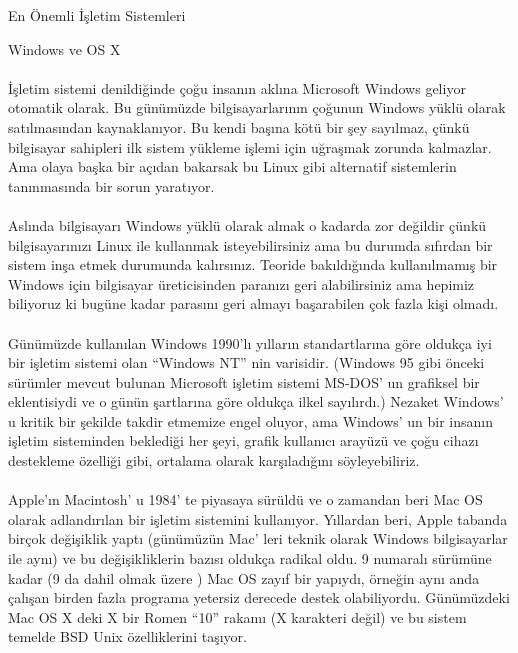 \documentclass[10pt,a5paper]{book}
\begin{document}
\begin{section}{En Önemli İşletim Sistemleri}
\begin{subsection}{Windows ve OS X}
\paragraph{}{İşletim sistemi denildiğinde çoğu insanın aklına Microsoft Windows geliyor otomatik olarak. Bu günümüzde bilgisayarlarının çoğunun Windows yüklü olarak satılmasından kaynaklanıyor. Bu kendi başına kötü bir şey sayılmaz, çünkü bilgisayar sahipleri ilk sistem yükleme işlemi için uğraşmak zorunda kalmazlar. Ama olaya başka bir açıdan bakarsak bu Linux gibi alternatif sistemlerin tanınmasında bir sorun yaratıyor.}
\paragraph{}{Aslında bilgisayarı Windows yüklü olarak almak o kadarda zor değildir çünkü bilgisayarınızı Linux ile kullanmak isteyebilirsiniz ama bu durumda sıfırdan bir sistem inşa etmek durumunda kalırsınız. Teoride bakıldığında kullanılmamış bir Windows için bilgisayar üreticisinden paranızı geri alabilirsiniz ama hepimiz biliyoruz ki bugüne kadar parasını geri almayı başarabilen çok fazla kişi olmadı.}
\paragraph{}{Günümüzde kullanılan Windows 1990'lı yılların standartlarına göre oldukça iyi bir işletim sistemi olan “Windows NT” nin  varisidir. (Windows 95 gibi önceki sürümler mevcut bulunan Microsoft işletim sistemi MS-DOS' un grafiksel bir eklentisiydi ve o günün şartlarına göre oldukça ilkel sayılırdı.) Nezaket Windows' u kritik bir şekilde takdir etmemize engel oluyor, ama Windows' un bir insanın işletim sisteminden beklediği her şeyi, grafik kullanıcı arayüzü ve çoğu cihazı destekleme özelliği gibi, ortalama olarak karşıladığını söyleyebiliriz.}
\paragraph{}{Apple’ın Macintosh' u 1984' te piyasaya sürüldü ve o zamandan beri Mac OS olarak adlandırılan bir işletim sistemini kullanıyor. Yıllardan beri, Apple tabanda birçok değişiklik yaptı (günümüzün Mac' leri teknik olarak Windows bilgisayarlar ile aynı) ve bu değişikliklerin bazısı oldukça radikal oldu. 9 numaralı sürümüne kadar (9 da dahil olmak üzere ) Mac OS zayıf bir yapıydı, örneğin aynı anda çalışan birden fazla programa yetersiz derecede destek olabiliyordu. Günümüzdeki Mac OS X deki X bir Romen “10” rakamı (X karakteri değil) ve bu sistem temelde BSD Unix özelliklerini taşıyor.}

\end{subsection}
\end{section}
\end{document}
